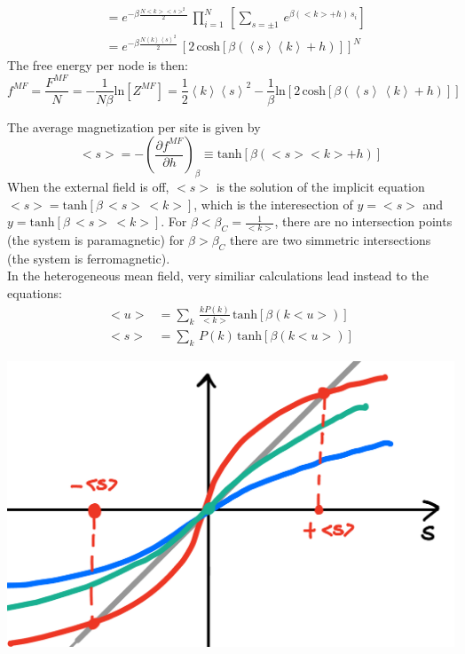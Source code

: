 {\begin{align*}
    &= e^{-\beta \frac{N <k><s>^2}{2}}\, \prod_{i=1}^{N}\, \left[ \sum_{s = \pm 1}\, e^{\beta(<k>+h)\,s_i} \right] \\
    &= e^{-\beta \frac{N \left\langle k \right \rangle\left\langle s \right \rangle^2}{2}}\,\left[2\,\text{cosh}\left[\beta(\left\langle s \right \rangle\left\langle k \right \rangle+h)\right]\right]^N
\end{align*}
The free energy per node is then:
\begin{equation*}
   f^{MF}= \frac{F^{MF}}{N} = - \frac{1}{N\beta}\text{ln}[Z^{MF}] = \frac{1}{2}\left\langle k \right \rangle\left\langle s \right \rangle^2 -\frac{1}{\beta}\text{ln}\left[2\,\text{cosh}[\beta(\left\langle s \right \rangle\,\left\langle k \right \rangle+h)]\right]
\end{equation*}
\begin{minipage}{0.55\textwidth}
The average magnetization per site is given by
\begin{equation*}
    <s> = -\left(\frac{\partial f^{MF}}{\partial h}\right)_\beta \equiv \text{tanh}[\beta(<s><k>+h)]
\end{equation*}
When the external field is off, $<s>$ is the solution of the implicit equation $<s> = \text{tanh}[\beta\,<s>\,<k>]$, which is the interesection of $y = <s>$ and $y = \text{tanh}[\beta\,<s>\,<k>]$.
For $\beta < \beta_C = \frac{1}{<k>}$, there are no intersection points (the system is paramagnetic) for $\beta > \beta_C$ there are two simmetric intersections (the system is ferromagnetic). \\
In the heterogeneous mean field, very similiar calculations \cite{analytical_ising} lead instead to the equations:
\begin{align*}
    <u> &= \sum_{k}\, \frac{k P(k)}{<k>}\,\text{tanh}[\beta ( k <u>)] \\ <s> &= \sum_k \, P(k)\,\text{tanh}[\beta ( k <u>)] 
\end{align*}
\end{minipage}
\hfill
\begin{minipage}{0.38\textwidth}
\centering
    \includegraphics[width = \textwidth]{latex_source/images/ising/IMG_56FE6CFC861B-1.jpeg}
\end{minipage}
}
